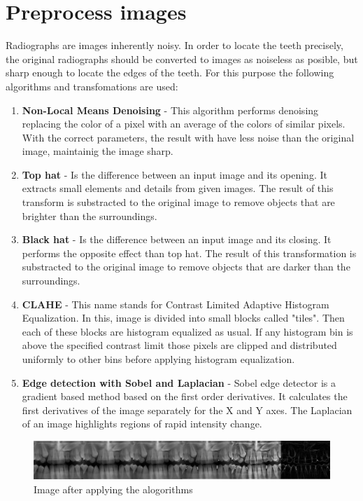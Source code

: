 \section{Preprocess images}

Radiographs are images inherently noisy. In order to locate
the teeth precisely, the original radiographs should be
converted to images as noiseless as posible, but sharp
enough to locate the edges of the teeth. For this purpose
the following algorithms and transfomations are used:

\begin{enumerate}
  \item \textbf{Non-Local Means Denoising} - This algorithm
  performs denoising replacing the color of a pixel with
  an average of the colors of similar pixels. With the correct
  parameters, the result with have less noise than the original
  image, maintainig the image sharp.
\item \textbf{Top hat} - Is the difference between an input
  image and its opening. It extracts small elements and details
  from given images. The result of this transform is substracted
  to the original image to remove objects that are brighter than
  the surroundings.
\item \textbf{Black hat} - Is the difference between an input
  image and its closing. It performs the opposite effect than
  top hat. The result of this transformation is substracted to
  the original image to remove objects that are darker than the
  surroundings.
\item \textbf{CLAHE} - This name stands for Contrast Limited
  Adaptive Histogram Equalization. In this, image is divided
  into small blocks called "tiles". Then each of these blocks
  are histogram equalized as usual. If any histogram bin is
  above the specified contrast limit those pixels are clipped
  and distributed uniformly to other bins before applying
  histogram equalization.
\item \textbf{Edge detection with Sobel and Laplacian} - Sobel
  edge detector is a gradient based method based on the first
  order derivatives. It calculates the first derivatives of
  the image separately for the X and Y axes. The Laplacian of
  an image highlights regions of rapid intensity change.
\end{enumerate}

\begin{figure}
  \centering
  \includegraphics[width=\linewidth]{img/enhancenment}
  \caption{Image after applying the alogorithms}
  \end{figure}
